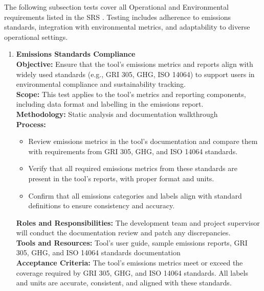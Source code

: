 \documentclass[12pt, titlepage]{article}
\begin{document}
\medskip

\noindent
The following subsection tests cover all Operational and Environmental requirements listed in the SRS \cite{SRS}. Testing includes adherence to emissions standards, integration with environmental metrics, and adaptability to diverse operational settings.

\begin{enumerate}[label={\bf \textcolor{Maroon}{test-OPE-\arabic*}}, wide=0pt, font=\itshape]
  \item \textbf{Emissions Standards Compliance} \\[2mm]
    \textbf{Objective:} Ensure that the tool’s emissions metrics and reports align with widely used standards (e.g., GRI 305, GHG, ISO 14064) to support users in environmental compliance and sustainability tracking. \\[2mm]
    \textbf{Scope:} This test applies to the tool's metrics and reporting components, including data format and labelling in the emissions report. \\[2mm]
    \textbf{Methodology:} Static analysis and documentation walkthrough \\[2mm]
    \textbf{Process:}
    \begin{itemize}
      \item Review emissions metrics in the tool’s documentation and compare them with requirements from GRI 305, GHG, and ISO 14064 standards.
      \item Verify that all required emissions metrics from these standards are present in the tool’s reports, with proper format and units.
      \item Confirm that all emissions categories and labels align with standard definitions to ensure consistency and accuracy.
    \end{itemize}
    \textbf{Roles and Responsibilities:} The development team and project supervisor will conduct the documentation review and patch any discrepancies. \\[2mm]
    \textbf{Tools and Resources:} Tool’s user guide, sample emissions reports, GRI 305, GHG, and ISO 14064 standards documentation \\[2mm]
    \textbf{Acceptance Criteria:} The tool’s emissions metrics meet or exceed the coverage required by GRI 305, GHG, and ISO 14064 standards. All labels and units are accurate, consistent, and aligned with these standards.



\end{enumerate}
\end{document}
